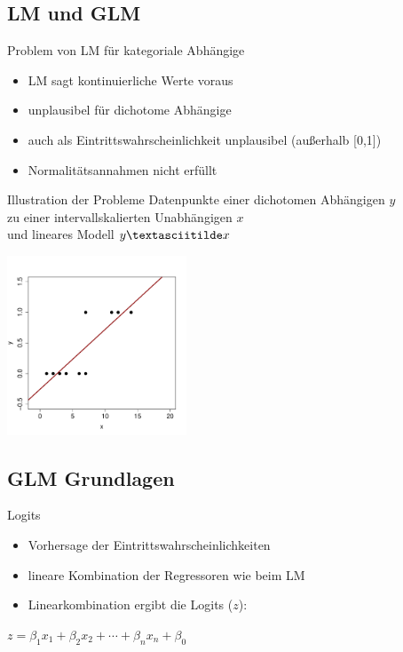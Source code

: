 \subsection{LM und GLM}

\begin{frame}
  {Problem von LM für kategoriale Abhängige}
  \begin{itemize}[<+->]
    \item LM sagt \alert{kontinuierliche Werte} voraus
    \item unplausibel für dichotome Abhängige
    \item auch als Eintrittswahrscheinlichkeit unplausibel (außerhalb [0,1])
    \item \alert{Normalitätsannahmen nicht erfüllt}
  \end{itemize}
\end{frame}

\begin{frame}
  {Illustration der Probleme}
  Datenpunkte einer dichotomen Abhängigen $y$\\
  zu einer intervallskalierten Unabhängigen $x$\\
  und lineares Modell $y\textasciitilde x$
  \begin{center}
    \includegraphics[width=0.4\textwidth]{graphics/lm_on_dichotomous}
  \end{center}
\end{frame}

\subsection{GLM Grundlagen}

\begin{frame}
  {Logits}
  \begin{itemize}[<+->]
    \item Vorhersage der \alert{Eintrittswahrscheinlichkeiten}
    \item \alert{lineare Kombination der Regressoren} wie beim LM
    \item Linearkombination ergibt die \alert{Logits} ($z$):
  \end{itemize}
  \pause
  \begin{center}
    $z=\beta_1x_1 + \beta_2x_2 + \cdots + \beta_nx_n + \beta_0$
  \end{center}
\end{frame}

